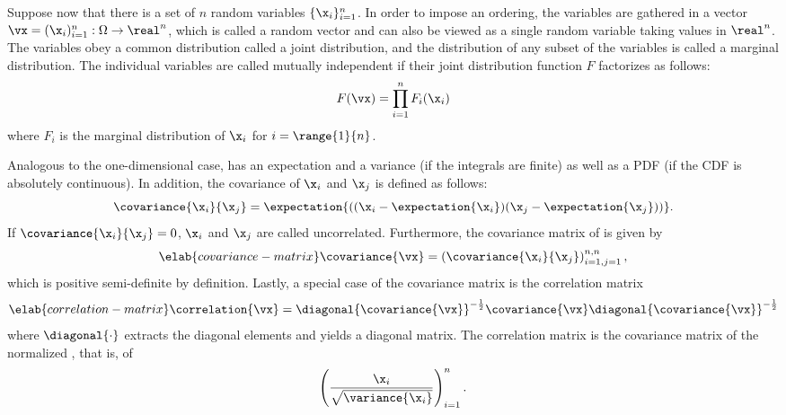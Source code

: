 Suppose now that there is a set of $n$ random variables $\{ \x_i \}_{i = 1}^n$.
In order to impose an ordering, the variables are gathered in a vector $\vx =
(\x_i)_{i = 1}^n: \Omega \to \real^n$, which is called a random vector and can
also be viewed as a single random variable taking values in $\real^n$. The
variables obey a common distribution called a joint distribution, and the
distribution of any subset of the variables is called a marginal distribution.
The individual variables are called mutually independent if their joint
distribution function $F$ factorizes as follows:
\[
  F(\vx) = \prod_{i = 1}^n F_i(\x_i)
\]
where $F_i$ is the marginal distribution of $\x_i$ for $i = \range{1}{n}$.

Analogous to the one-dimensional case, \vx has an expectation and a variance (if
the integrals are finite) as well as a \ac{PDF} (if the \ac{CDF} is absolutely
continuous). In addition, the covariance of $\x_i$ and $\x_j$ is defined as
follows:
\[
  \covariance{\x_i}{\x_j} = \expectation{((\x_i - \expectation{\x_i})(\x_j - \expectation{\x_j}))}.
\]
If $\covariance{\x_i}{\x_j} = 0$, $\x_i$ and $\x_j$ are called uncorrelated.
Furthermore, the covariance matrix of \vx is given by
\begin{equation} \elab{covariance-matrix}
  \covariance{\vx} = \left(\covariance{\x_i}{\x_j}\right)_{i = 1, j = 1}^{n, n},
\end{equation}
which is positive semi-definite by definition. Lastly, a special case of the
covariance matrix is the correlation matrix
\begin{equation} \elab{correlation-matrix}
  \correlation{\vx} = \diagonal{\covariance{\vx}}^{-\frac{1}{2}} \covariance{\vx} \diagonal{\covariance{\vx}}^{-\frac{1}{2}}
\end{equation}
where $\diagonal{\cdot}$ extracts the diagonal elements and yields a diagonal
matrix. The correlation matrix is the covariance matrix of the normalized \vx,
that is, of
\[
  \left(\frac{\x_i}{\sqrt{\variance{\x_i}}}\right)_{i = 1}^n.
\]
